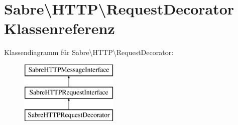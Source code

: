 \hypertarget{class_sabre_1_1_h_t_t_p_1_1_request_decorator}{}\section{Sabre\textbackslash{}H\+T\+TP\textbackslash{}Request\+Decorator Klassenreferenz}
\label{class_sabre_1_1_h_t_t_p_1_1_request_decorator}
Klassendiagramm für Sabre\textbackslash{}H\+T\+TP\textbackslash{}Request\+Decorator\+:\begin{figure}[H]
\begin{center}
\leavevmode
\includegraphics[height=3.000000cm]{class_sabre_1_1_h_t_t_p_1_1_request_decorator}
\end{center}
\end{figure}
